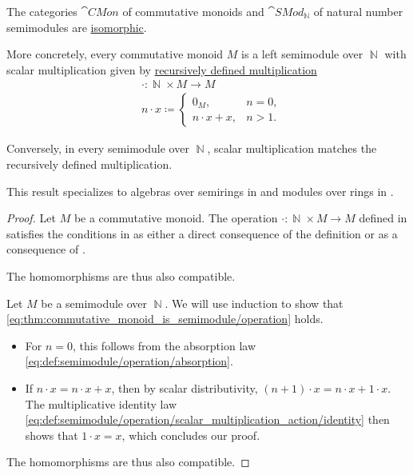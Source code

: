 \begin{proposition}\label{thm:commutative_monoid_is_semimodule}
  The categories \( \hyperref[def:monoid/category]{\cat{CMon}} \) of commutative monoids and \( \hyperref[def:semimodule/category]{\cat{SMod}_\BbbN} \) of natural number semimodules are \hyperref[rem:category_similarity/isomorphism]{isomorphic}.

  More concretely, every commutative monoid \( M \) is a left semimodule over \( \BbbN \) with scalar multiplication given by \hyperref[rem:additive_semigroup/multiplication]{recursively defined multiplication}
  \begin{equation}\label{eq:thm:commutative_monoid_is_semimodule/operation}
    \begin{aligned}
      &\cdot: \BbbN \times M \to M \\
      &n \cdot x \coloneqq \begin{cases}
        0_M,           &n = 0, \\
        n \cdot x + x, &n > 1.
      \end{cases}
    \end{aligned}
  \end{equation}

  Conversely, in every semimodule over \( \BbbN \), scalar multiplication matches the recursively defined multiplication.
\end{proposition}
\begin{comments}
  \item This result specializes to algebras over semirings in  and modules over rings in .
\end{comments}
\begin{proof}
  \SufficiencySubProof Let \( M \) be a commutative monoid. The operation \( \cdot: \BbbN \times M \to M \) defined in  satisfies the conditions in  as either a direct consequence of the definition or as a consequence of .

  The homomorphisms are thus also compatible.

  \NecessitySubProof Let \( M \) be a semimodule over \( \BbbN \). We will use induction to show that \eqref{eq:thm:commutative_monoid_is_semimodule/operation} holds.
  \begin{itemize}
    \item For \( n = 0 \), this follows from the absorption law \eqref{eq:def:semimodule/operation/absorption}.
    \item If \( n \cdot x = n \cdot x + x \), then by scalar distributivity, \( (n + 1) \cdot x = n \cdot x + 1 \cdot x \). The multiplicative identity law \eqref{eq:def:semimodule/operation/scalar_multiplication_action/identity} then shows that \( 1 \cdot x = x \), which concludes our proof.
  \end{itemize}

  The homomorphisms are thus also compatible.
\end{proof}

